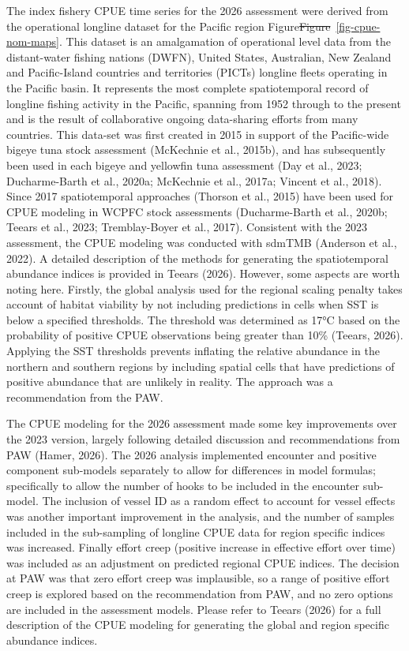 \documentclass[
  english,
  a4paper,
  a4paper,
  11pt]{SCreport}
\providecommand{\DIFdel}[1]{{\protect\color{red}\sout{#1}}}                      %
\providecommand{\DIFdelbegin}{} %
\providecommand{\DIFdelend}{} %
\newcommand{\DIFscaledelfig}{0.5}
\newlength{\DIFdelgraphicswidth} %
\newlength{\DIFdelgraphicsheight} %
\newcommand{\DIFdelincludegraphics}[2][]{%
\sbox{\DIFdelgraphicsbox}{\DIFOincludegraphics[#1]{#2}}%
\settoboxwidth{\DIFdelgraphicswidth}{\DIFdelgraphicsbox} %
\settoboxtotalheight{\DIFdelgraphicsheight}{\DIFdelgraphicsbox} %
\scalebox{\DIFscaledelfig}{%
\parbox[b]{\DIFdelgraphicswidth}{\usebox{\DIFdelgraphicsbox}\\[-\baselineskip] \rule{\DIFdelgraphicswidth}{0em}}\llap{\resizebox{\DIFdelgraphicswidth}{\DIFdelgraphicsheight}{%
\setlength{\unitlength}{\DIFdelgraphicswidth}%
\begin{picture}(1,1)%
\thicklines\linethickness{2pt} %
{\color[rgb]{1,0,0}\put(0,0){\framebox(1,1){}}}%
{\color[rgb]{1,0,0}\put(0,0){\line( 1,1){1}}}%
{\color[rgb]{1,0,0}\put(0,1){\line(1,-1){1}}}%
\end{picture}%
}\hspace*{3pt}}} %
} %
\DeclareRobustCommand{\DIFdelbegin}{\DIFOdelbegin \let\includegraphics\DIFdelincludegraphics} %
\DeclareRobustCommand{\DIFdelend}{\DIFOaddend \let\includegraphics\DIFOincludegraphics} %
\begin{document}
The index fishery CPUE time series for the 2026 assessment were derived
from the operational longline dataset for the Pacific region
Figure\DIFdelbegin \DIFdel{Figure}\DIFdelend ~\ref{fig-cpue-nom-maps}. This dataset is an amalgamation of
operational level data from the distant-water fishing nations (DWFN),
United States, Australian, New Zealand and Pacific-Island countries and
territories (PICTs) longline fleets operating in the Pacific basin. It
represents the most complete spatiotemporal record of longline fishing
activity in the Pacific, spanning from 1952 through to the present and
is the result of collaborative ongoing data-sharing efforts from many
countries. This data-set was first created in 2015 in support of the
Pacific-wide bigeye tuna stock assessment (McKechnie et al., 2015b), and
has subsequently been used in each bigeye and yellowfin tuna assessment
(Day et al., 2023; Ducharme-Barth et al., 2020a; McKechnie et al.,
2017a; Vincent et al., 2018). Since 2017 spatiotemporal approaches
(Thorson et al., 2015) have been used for CPUE modeling in WCPFC stock
assessments (Ducharme-Barth et al., 2020b; Teears et al., 2023;
Tremblay-Boyer et al., 2017). Consistent with the 2023 assessment, the
CPUE modeling was conducted with sdmTMB (Anderson et al., 2022). A
detailed description of the methods for generating the spatiotemporal
abundance indices is provided in Teears (2026). However, some aspects
are worth noting here. Firstly, the global analysis used for the
regional scaling penalty takes account of habitat viability by not
including predictions in cells when SST is below a specified thresholds.
The threshold was determined as 17°C based on the probability of
positive CPUE observations being greater than 10\% (Teears, 2026).
Applying the SST thresholds prevents inflating the relative abundance in
the northern and southern regions by including spatial cells that have
predictions of positive abundance that are unlikely in reality. The
approach was a recommendation from the PAW.

The CPUE modeling for the 2026 assessment made some key improvements
over the 2023 version, largely following detailed discussion and
recommendations from PAW (Hamer, 2026). The 2026 analysis implemented
encounter and positive component sub-models separately to allow for
differences in model formulas; specifically to allow the number of hooks
to be included in the encounter sub-model. The inclusion of vessel ID as
a random effect to account for vessel effects was another important
improvement in the analysis, and the number of samples included in the
sub-sampling of longline CPUE data for region specific indices was
increased. Finally effort creep (positive increase in effective effort
over time) was included as an adjustment on predicted regional CPUE
indices. The decision at PAW was that zero effort creep was implausible,
so a range of positive effort creep is explored based on the
recommendation from PAW, and no zero options are included in the
assessment models. Please refer to Teears (2026) for a full description
of the CPUE modeling for generating the global and region specific
abundance indices.
\end{document}

